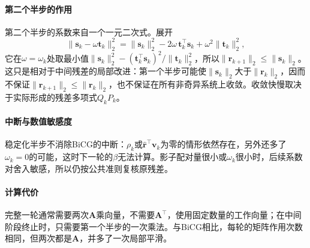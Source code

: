 \paragraph{第二个半步的作用}
第二个半步的系数来自一个一元二次式。展开
\[
 \lVert\bm s_k-\omega\bm t_k\rVert_2^2=\lVert\bm s_k\rVert_2^2-2\omega\,\bm t_k^\top\bm s_k+\omega^2\lVert\bm t_k\rVert_2^2,
\]
它在$\omega=\omega_k$处取最小值$\lVert\bm s_k\rVert_2^2-(\bm t_k^\top\bm s_k)^2/\lVert\bm t_k\rVert_2^2$，所以$\lVert\bm r_{k+1}\rVert_2\le\lVert\bm s_k\rVert_2$。这只是相对于中间残差的局部改进：第一个半步可能使$\lVert\bm s_k\rVert_2$大于$\lVert\bm r_k\rVert_2$，因而不保证$\lVert\bm r_{k+1}\rVert_2\le\lVert\bm r_k\rVert_2$，也不保证在所有非奇异系统上收敛。收敛快慢取决于实际形成的残差多项式$Q_kP_k$。

\paragraph{中断与数值敏感度}
稳定化半步不消除BiCG的中断：$\rho_k$或$\widehat{\bm r}^\top\bm v_k$为零的情形依然存在，另外还多了$\omega_k=0$的可能，这时下一轮的$\beta$无法计算。影子配对量很小或$\omega_k$很小时，后续系数对舍入敏感，所以仍按公共准则复核原残差。

\paragraph{计算代价}
完整一轮通常需要两次$\bm A$乘向量，不需要$\bm A^\top$，使用固定数量的工作向量；在中间阶段终止时，只需要第一个半步的一次乘法。与BiCG相比，每轮的矩阵作用次数相同，但两次都是$\bm A$，并多了一次局部平滑。

